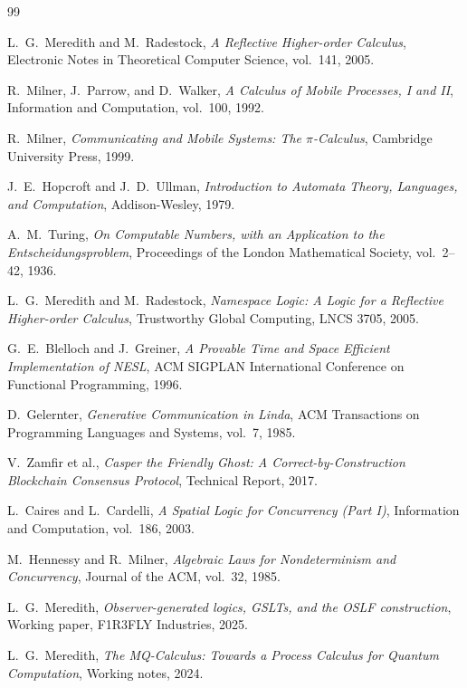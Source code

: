 \documentclass[11pt]{article}
\theoremstyle{plain}
\theoremstyle{definition}
\theoremstyle{remark}
\begin{document}
\begin{thebibliography}{99}

L.~G.~Meredith and M.~Radestock,
\emph{A Reflective Higher-order Calculus},
Electronic Notes in Theoretical Computer Science, vol.~141, 2005.

R.~Milner, J.~Parrow, and D.~Walker,
\emph{A Calculus of Mobile Processes, I and II},
Information and Computation, vol.~100, 1992.

R.~Milner,
\emph{Communicating and Mobile Systems: The $\pi$-Calculus},
Cambridge University Press, 1999.

J.~E.~Hopcroft and J.~D.~Ullman,
\emph{Introduction to Automata Theory, Languages, and Computation},
Addison-Wesley, 1979.

A.~M.~Turing,
\emph{On Computable Numbers, with an Application to the
Entscheidungsproblem},
Proceedings of the London Mathematical Society, vol.~2--42, 1936.

L.~G.~Meredith and M.~Radestock,
\emph{Namespace Logic: A Logic for a Reflective Higher-order Calculus},
Trustworthy Global Computing, LNCS 3705, 2005.

G.~E.~Blelloch and J.~Greiner,
\emph{A Provable Time and Space Efficient Implementation of NESL},
ACM SIGPLAN International Conference on Functional Programming, 1996.

D.~Gelernter,
\emph{Generative Communication in Linda},
ACM Transactions on Programming Languages and Systems, vol.~7, 1985.

V.~Zamfir et al.,
\emph{Casper the Friendly Ghost: A Correct-by-Construction Blockchain
Consensus Protocol},
Technical Report, 2017.

L.~Caires and L.~Cardelli,
\emph{A Spatial Logic for Concurrency (Part I)},
Information and Computation, vol.~186, 2003.

M.~Hennessy and R.~Milner,
\emph{Algebraic Laws for Nondeterminism and Concurrency},
Journal of the ACM, vol.~32, 1985.

L.~G.~Meredith,
\emph{Observer-generated logics, GSLTs, and the OSLF construction},
Working paper, F1R3FLY Industries, 2025.

L.~G.~Meredith,
\emph{The MQ-Calculus: Towards a Process Calculus for Quantum Computation},
Working notes, 2024.

\end{thebibliography}
\end{document}
